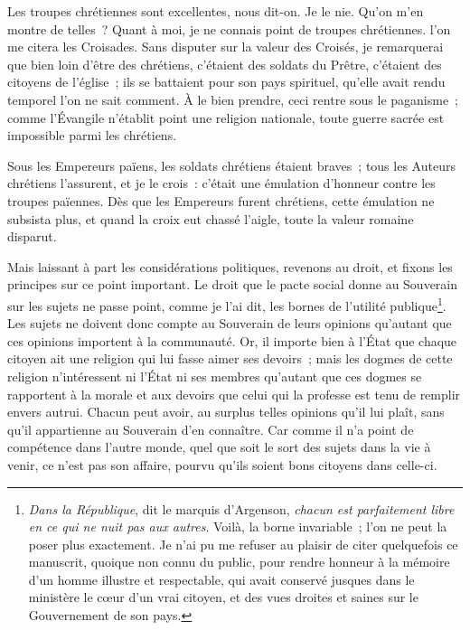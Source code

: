 \documentclass[french,twoside]{book} %
\begin{document}
Les troupes chrétiennes sont excellentes, nous dit-on. Je le nie. Qu’on m’en montre de telles ? Quant à moi, je ne connais point de troupes chrétiennes. l’on me citera les Croisades. Sans disputer sur la valeur des Croisés, je remarquerai que bien loin d’être des chrétiens, c’étaient des soldats du Prêtre, c’étaient des citoyens de l’église ; ils se battaient pour son pays spirituel, qu’elle avait rendu temporel l’on ne sait comment. À le bien prendre, ceci rentre sous le paganisme ; comme l’Évangile n’établit point une religion nationale, toute guerre sacrée est impossible parmi les chrétiens.\par
Sous les Empereurs païens, les soldats chrétiens étaient braves ; tous les Auteurs chrétiens l’assurent, et je le crois : c’était une émulation d’honneur contre les troupes païennes. Dès que les Empereurs furent chrétiens, cette émulation ne subsista plus, et quand la croix eut chassé l’aigle, toute la valeur romaine disparut.\par
Mais laissant à part les considérations politiques, revenons au droit, et fixons les principes sur ce point important. Le droit que le pacte social donne au Souverain sur les sujets ne passe point, comme je l’ai dit, les bornes de l’utilité publique\footnote{{\itshape Dans la République}, dit le marquis d’Argenson, {\itshape chacun est parfaitement libre en ce qui ne nuit pas aux autres}. Voilà, la borne invariable ; l’on ne peut la poser plus exactement. Je n’ai pu me refuser au plaisir de citer quelquefois ce manuscrit, quoique non connu du public, pour rendre honneur à la mémoire d’un homme illustre et respectable, qui avait conservé jusques dans le ministère le cœur d’un vrai citoyen, et des vues droites et saines sur le Gouvernement de son pays.}. Les sujets ne doivent donc compte au Souverain de leurs opinions qu’autant que ces opinions importent à la communauté. Or, il importe bien à l’État que chaque citoyen ait une religion qui lui fasse aimer ses devoirs ; mais les dogmes de cette religion n’intéressent ni l’État ni ses membres qu’autant que ces dogmes se rapportent à la morale et aux devoirs que celui qui la professe est tenu de remplir envers autrui. Chacun peut avoir, au surplus telles opinions qu’il lui plaît, sans qu’il appartienne au Souverain d’en connaître. Car comme il n’a point de compétence dans l’autre monde, quel que soit le sort des sujets dans la vie à venir, ce n’est pas son affaire, pourvu qu’ils soient bons citoyens dans celle-ci.\par
\end{document}
